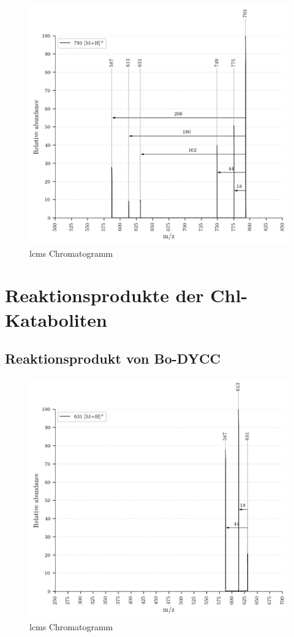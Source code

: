 \begin{figure}[!htbp]
  \centering
  \includegraphics[width=\textwidth, height=0.7\textwidth]{figures/Kapitel7/Kataboliten/VWA_MS_793.png}
  \caption[LC-MS Chromatogramm vor der Reaktion, Quelle: Author]{\gls{lcms} Chromatogramm}
  \label{fig:LCMSChromatogramm}
\end{figure}



\section{Reaktionsprodukte der Chl-Kataboliten}

\subsection{Reaktionsprodukt von Bo-DYCC}

\begin{figure}[!htbp]
  \centering
  \includegraphics[width=\textwidth, height=0.7\textwidth]{figures/Kapitel7/Kataboliten/VWA_MS_631.png}
  \caption[LC-MS Chromatogramm vor der Reaktion, Quelle: Author]{\gls{lcms} Chromatogramm}
  \label{fig:LCMSChromatogramm}
\end{figure}

